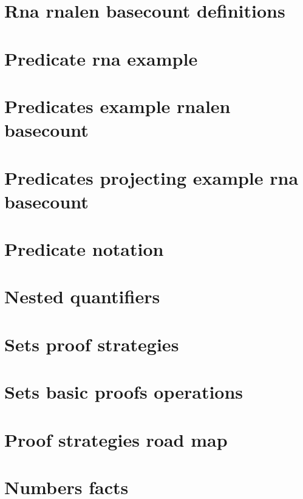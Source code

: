 \section*{Rna rnalen basecount definitions}

\vfill
\section*{Predicate rna example}

\vfill
\section*{Predicates example rnalen basecount}

\vfill
\section*{Predicates projecting example rna basecount}

\vfill
\section*{Predicate notation}

\vfill
\section*{Nested quantifiers}

\vfill
\section*{Sets proof strategies}

\vfill
\section*{Sets basic proofs operations}

\vfill
\section*{Proof strategies road map}

\vfill
\section*{Numbers facts}

\vfill
